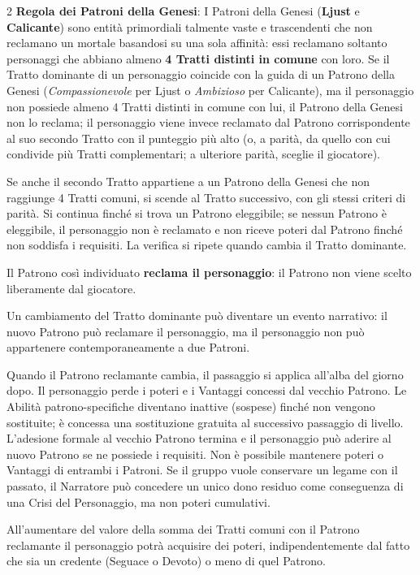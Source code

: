 \begin{multicols}{2}
\textbf{Regola dei Patroni della Genesi}: I Patroni della Genesi (\textbf{Ljust} e \textbf{Calicante}) sono entità primordiali talmente vaste e trascendenti che non reclamano un mortale basandosi su una sola affinità: essi reclamano soltanto personaggi che abbiano almeno \textbf{4 Tratti distinti in comune} con loro. Se il Tratto dominante di un personaggio coincide con la guida di un Patrono della Genesi (\emph{Compassionevole} per Ljust o \emph{Ambizioso} per Calicante), ma il personaggio non possiede almeno 4 Tratti distinti in comune con lui, il Patrono della Genesi non lo reclama; il personaggio viene invece reclamato dal Patrono corrispondente al suo secondo Tratto con il punteggio più alto (o, a parità, da quello con cui condivide più Tratti complementari; a ulteriore parità, sceglie il giocatore).

Se anche il secondo Tratto appartiene a un Patrono della Genesi che non raggiunge 4 Tratti comuni, si scende al Tratto successivo, con gli stessi criteri di parità. Si continua finché si trova un Patrono eleggibile; se nessun Patrono è eleggibile, il personaggio non è reclamato e non riceve poteri dal Patrono finché non soddisfa i requisiti. La verifica si ripete quando cambia il Tratto dominante.

Il Patrono così individuato \textbf{reclama il personaggio}: il Patrono non viene scelto liberamente dal giocatore.

Un cambiamento del Tratto dominante può diventare un evento narrativo: il nuovo Patrono può reclamare il personaggio, ma il personaggio non può appartenere contemporaneamente a due Patroni.

Quando il Patrono reclamante cambia, il passaggio si applica all'alba del giorno dopo. Il personaggio perde i poteri e i Vantaggi concessi dal vecchio Patrono. Le Abilità patrono-specifiche diventano inattive (sospese) finché non vengono sostituite; è concessa una sostituzione gratuita al successivo passaggio di livello. L'adesione formale al vecchio Patrono termina e il personaggio può aderire al nuovo Patrono se ne possiede i requisiti. Non è possibile mantenere poteri o Vantaggi di entrambi i Patroni. Se il gruppo vuole conservare un legame con il passato, il Narratore può concedere un unico dono residuo come conseguenza di una Crisi del Personaggio, ma non poteri cumulativi.

All'aumentare del valore della somma dei Tratti comuni con il Patrono reclamante il personaggio potrà acquisire dei poteri, indipendentemente dal fatto che sia un credente (Seguace o Devoto) o meno di quel Patrono.


\end{multicols}
